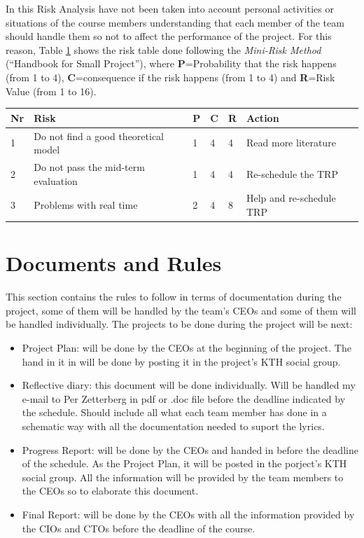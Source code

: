 \documentclass[11pt]{article}
\begin{document}
In this Risk Analysis have not been taken into account personal activities or situations of the course members understanding that each member of the team should handle them so not to affect the performance of the project. For this reason, Table \ref{tablerisk} shows the risk table done following the \textit{Mini-Risk Method} (``Handbook for Small Project''), where \textbf{P}=Probability that the risk happens (from 1 to 4), \textbf{C}=consequence if the risk happens (from 1 to 4) and \textbf{R}=Risk Value (from 1 to 16).


\begin{table}[h]
\label{tablerisk}
\centering
\begin{tabular}{l| l| l| l| l| l}
 Nr &Risk  &P  &C  &R &Action  \\
 \hline
 1 & Do not find a good theoretical model & 1 & 4 & 4 & Read more literature\\
 2 & Do not pass the mid-term evaluation & 1 & 4 & 4 & Re-schedule the TRP\\
 3 & Problems with real time & 2 & 4 & 8 & Help and re-schedule TRP \\
\end{tabular}
\end{table}



\section{Documents and Rules}
This section contains the rules to follow in terms of documentation during the project, some of them will be handled by the team's CEOs and some of them will be handled individually. The projects to be done during the project will be next:

\begin{itemize}
\item Project Plan: will be done by the CEOs at the beginning of the project. The hand in it in will be done by posting it in the project's KTH social group.

\item Reflective diary: this document will be done individually. Will be handled my e-mail to Per Zetterberg in pdf or .doc file before the deadline indicated by the schedule. Should include all what each team member has done in a schematic way with all the documentation needed to suport the lyrics.

\item Progress Report: will be done by the CEOs and handed in before the deadline of the schedule. As the Project Plan, it will be posted in the porject's KTH social group.  All the information will be provided by the team members to the CEOs so to elaborate this document.

\item Final Report: will be done by the CEOs with all the information provided by the CIOs and CTOs before the deadline of the course.
\end{itemize}
\end{document}
